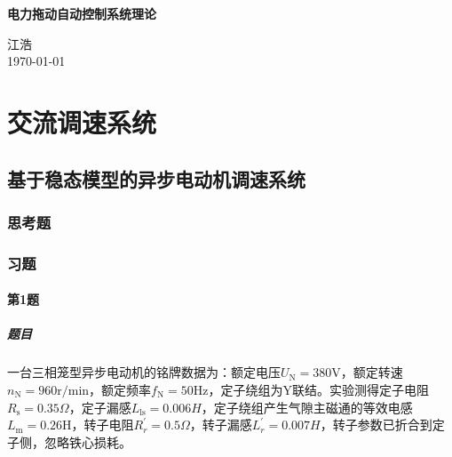 \documentclass[12pt, a4paper, UTF8, fontset=adobe, oneside]{ctexbook} %
\begin{document}
\frontmatter
\begin{titlepage}
\begin{center}

\vspace*{5cm}
{\huge \bfseries 电力拖动自动控制系统理论}\\[0.4cm]

\vspace{12cm}

{\large 江浩} \\[1cm]
{\large \today}

\end{center}
\end{titlepage}

\begin{titlepage}
\begin{center}

\end{center}
\end{titlepage}

{
\hypersetup{linkcolor=black} %
\tableofcontents %
}

\mainmatter %

\part{交流调速系统}

\chapter{基于稳态模型的异步电动机调速系统}

\section{思考题}

\section{习题}
\subsection{第1题}
\subsubsection{题目}
一台三相笼型异步电动机的铭牌数据为：额定电压$U_{\mathrm{N}}=380\mathrm{V}$，额定转速$n_{\mathrm{N}}=960\mathrm{r/min}$，额定频率$f_{\mathrm{N}}=50\mathrm{Hz}$，定子绕组为Y联结。实验测得定子电阻$R_{\mathrm{s}}=0.35\Omega$，定子漏感$L_{\mathrm{ls}}=0.006H$，定子绕组产生气隙主磁通的等效电感$L_{\mathrm{m}}=0.26\mathrm{H}$，转子电阻$R_r^{'}=0.5\Omega$，转子漏感$L_{r}^{'}=0.007H$，转子参数已折合到定子侧，忽略铁心损耗。
\end{document}
